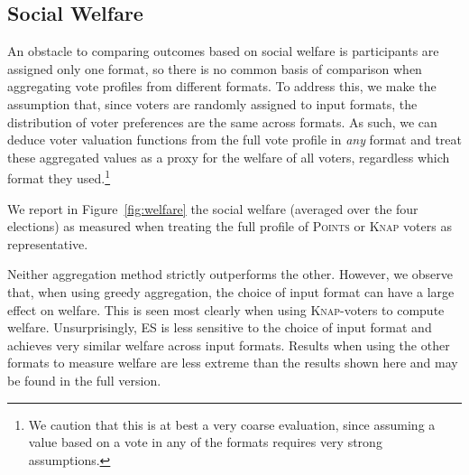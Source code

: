 \documentclass[letterpaper]{article} %
\newcommand{\points}{\textsc{Points}}
\newcommand{\knap}{\textsc{Knap}}
\newcommand{\mes}{ES}
\begin{document}
\subsection{Social Welfare}
An obstacle to comparing outcomes based on social welfare is participants are assigned only one format, so there is no common basis of comparison when aggregating vote profiles from different formats. To address this, we make the assumption that, since voters are randomly assigned to input formats, the distribution of voter preferences are the same across formats. As such, we can deduce voter valuation functions from the full vote profile in \emph{any} format and treat these aggregated values as a proxy for the welfare of all voters, regardless which format they used.\footnote{ We caution that this is at best a very coarse evaluation, since assuming a value based on  a vote in any of the formats requires very strong assumptions. %
} %

We report in Figure~\ref{fig:welfare} the   social welfare (averaged over the four elections) as measured when treating the full profile of \points{} or \knap{} voters as representative.  %


Neither aggregation method strictly outperforms the other. However, we observe that, when using greedy aggregation, the choice of input format can have a large effect on welfare. This is seen most clearly when using \knap-voters to compute welfare. Unsurprisingly, \mes{} is less sensitive to  the choice of input format and   achieves very similar welfare across input formats.
Results when using the other formats to measure welfare are less extreme than the results shown here and may be found in the full version.
\end{document}
